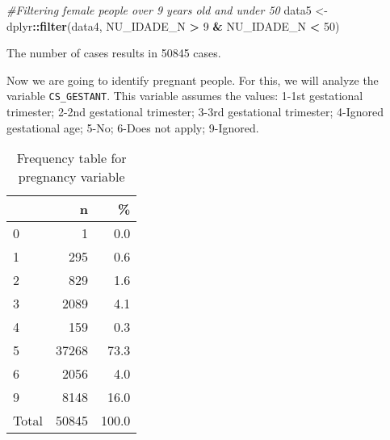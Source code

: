 \documentclass[
]{article}
\newenvironment{Shaded}{\begin{snugshade}}{\end{snugshade}}
\newcommand{\CommentTok}[1]{\textcolor[rgb]{0.56,0.35,0.01}{\textit{#1}}}
\newcommand{\DataTypeTok}[1]{\textcolor[rgb]{0.13,0.29,0.53}{#1}}
\newcommand{\DecValTok}[1]{\textcolor[rgb]{0.00,0.00,0.81}{#1}}
\newcommand{\KeywordTok}[1]{\textcolor[rgb]{0.13,0.29,0.53}{\textbf{#1}}}
\newcommand{\NormalTok}[1]{#1}
\newcommand{\OperatorTok}[1]{\textcolor[rgb]{0.81,0.36,0.00}{\textbf{#1}}}
\newcommand{\OtherTok}[1]{\textcolor[rgb]{0.56,0.35,0.01}{#1}}
\newcommand{\StringTok}[1]{\textcolor[rgb]{0.31,0.60,0.02}{#1}}
\begin{document}
\begin{Shaded}
\begin{Highlighting}[]
\CommentTok{#Filtering female people over 9 years old and under 50}
\NormalTok{data5 <-}\StringTok{ }\NormalTok{dplyr}\OperatorTok{::}\KeywordTok{filter}\NormalTok{(data4, NU_IDADE_N }\OperatorTok{>}\StringTok{ }\DecValTok{9} \OperatorTok{&}\StringTok{ }\NormalTok{NU_IDADE_N }\OperatorTok{<}\StringTok{ }\DecValTok{50}\NormalTok{)}
\end{Highlighting}
\end{Shaded}

The number of cases results in 50845 cases.

Now we are going to identify pregnant people. For this, we will analyze
the variable \texttt{CS\_GESTANT}. This variable assumes the values:
1-1st gestational trimester; 2-2nd gestational trimester; 3-3rd
gestational trimester; 4-Ignored gestational age; 5-No; 6-Does not
apply; 9-Ignored.

\begin{Shaded}
\end{Shaded}

\begin{table}[!h]

\caption{\label{tab:unnamed-chunk-15}Frequency table for pregnancy variable}
\centering
\begin{tabular}[t]{l|r|r}
\hline
  & n & \%\\
\hline
0 & 1 & 0.0\\
\hline
1 & 295 & 0.6\\
\hline
2 & 829 & 1.6\\
\hline
3 & 2089 & 4.1\\
\hline
4 & 159 & 0.3\\
\hline
5 & 37268 & 73.3\\
\hline
6 & 2056 & 4.0\\
\hline
9 & 8148 & 16.0\\
\hline
Total & 50845 & 100.0\\
\hline
\end{tabular}
\end{table}
\end{document}
